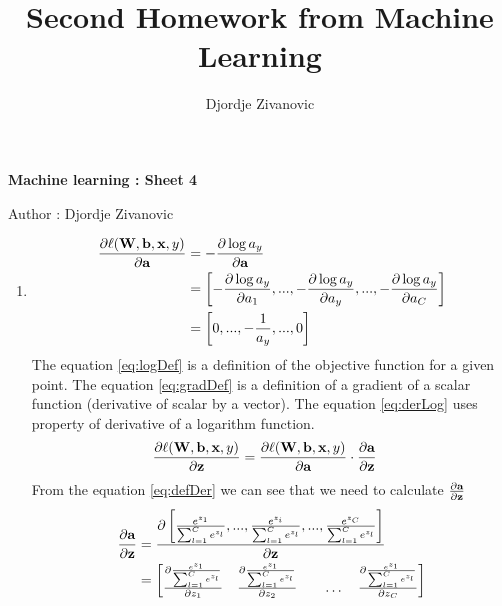 \documentclass[10pt,a4paper]{article}
\author{Djordje Zivanovic}
\title{Second Homework from Machine Learning}
\begin{document}
\centerline{\large \bf Machine learning : Sheet 4}
\centerline{\large Author : Djordje Zivanovic}
\bigskip
\newcommand{\transpose}[1]{#1 ^ \text{T}}
\newcommand{\mat}[1]{\textbf{\text{{#1}}}}
\newcommand{\vect}[1]{\mat{#1}}
\newcommand{\gradient}[1]{\nabla_{\vect{#1}}}
\newcommand{\der}[1]{\frac{\partial}{\partial #1}}
\newcommand{\numberthis}{\addtocounter{equation}{1}\tag{\theequation}}
\newcommand{\logfun}{\sigma(\transpose{\vect{x}}_i \vect{w})}
\newcommand{\softmaxi}{\frac{e^{z_i}}{\sum_{l=1}^Ce^{z_l}}}
\newcommand{\layersep}{2.5cm}
\begin{enumerate}
\item 
\begin{align}
\frac{\partial \ell (\mat{W}, \vect{b}, \vect{x}, y)}{\partial \vect{a}} 
&= -\frac{\partial \log a_y}{\partial \vect{a}} \label{eq:logDef}\\
&= \left[ -\frac{\partial \log a_y}{\partial a_1}, ..., -\frac{\partial \log a_y}{\partial a_y}, ..., -\frac{\partial \log a_y}{\partial a_C}  \right] \label{eq:gradDef}\\
&= \left[0, ..., -\frac{1}{a_y}, ..., 0\right] \label{eq:derLog}
\end{align}
The equation \ref{eq:logDef} is a definition of the objective function for a given point. The equation \ref{eq:gradDef} is a definition of a gradient of a scalar function (derivative of scalar by a vector). The equation \ref{eq:derLog} uses property of derivative of a logarithm function.
\begin{align}
\frac{\partial \ell (\mat{W}, \vect{b}, \vect{x}, y)}{\partial \vect{z}} 
&=\frac{\partial \ell (\mat{W}, \vect{b}, \vect{x}, y)}{\partial \vect{a}}
\cdot \frac{\partial \vect{a}}{\partial \vect{z}}   \label{eq:defDer}
\end{align}
From the equation \ref{eq:defDer} we can see that we need to calculate $\frac{\partial\vect{a}}{\partial\vect{z}}$
\begin{align}
\frac{\partial \vect{a}}{\partial \vect{z}} 
&=\frac{\partial \left[ \frac{ e^{z_{1}}}{\sum_{l=1}^{C}e^{z_{l}}}, ..., \frac{ e^{z_{i}}}{\sum_{l=1}^{C}e^{z_{l}}},..., \frac{ e^{z_{C}}}{\sum_{l=1}^{C}e^{z_{l}}} \right]}{\partial \vect{z}}\\
&=\begin{bmatrix}
    \frac{\partial \frac{ e^{z_{1}}}{\sum_{l=1}^{C}e^{z_{l}}}}{\partial z_1}     & 
    \frac{\partial \frac{ e^{z_{1}}}{\sum_{l=1}^{C}e^{z_{l}}}}{\partial z_2}     &  & \dots & \frac{\partial \frac{ e^{z_{1}}}{\sum_{l=1}^{C}e^{z_{l}}}}{\partial z_C} \\

\end{bmatrix}
\end{align}
\end{enumerate}
\end{document}
